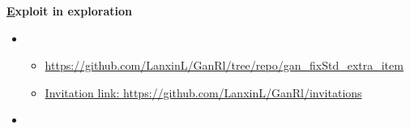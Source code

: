 \documentclass[letterpaper,11pt]{article}
\newcommand{\resumeItem}[2]{
  \item\small{
    \textbf{#1}{#2 \vspace{-2pt}}
  }
}
\begin{document}
        \resumeItem{\href{}Exploit in exploration} \\
        \begin{itemize}
          \item{}
          \begin{itemize} \item \href{https://github.com/LanxinL/GanRl/tree/repo/gan_fixStd_extra_item}{https://github.com/LanxinL/GanRl/tree/repo/gan\_fixStd\_extra\_item} \end{itemize}
          \begin{itemize} \item \href{https://github.com/LanxinL/GanRl/invitations}{Invitation link: https://github.com/LanxinL/GanRl/invitations} \end{itemize}
            \item {} 
        \end{itemize}
\end{document}
